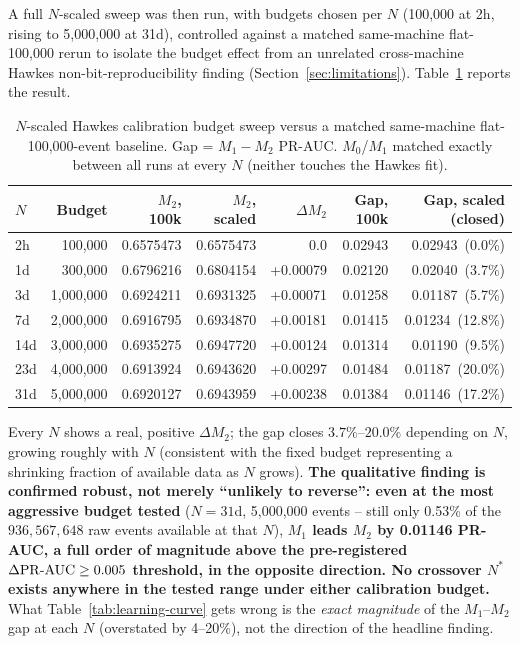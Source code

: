 A full $N$-scaled sweep was then run, with budgets chosen per $N$
(100{,}000 at 2h, rising to 5{,}000{,}000 at 31d), controlled against a
matched same-machine flat-100{,}000 rerun to isolate the budget effect
from an unrelated cross-machine Hawkes non-bit-reproducibility finding
(Section~\ref{sec:limitations}). Table~\ref{tab:calibration-sweep}
reports the result.

\begin{table}[htbp]
\centering
\caption{$N$-scaled Hawkes calibration budget sweep versus a matched
same-machine flat-100{,}000-event baseline. Gap = $M_1 - M_2$ PR-AUC.
$M_0$/$M_1$ matched exactly between all runs at every $N$ (neither
touches the Hawkes fit).}
\label{tab:calibration-sweep}
\begin{tabular}{@{}lrrrrrr@{}}
\toprule
$N$ & Budget & $M_2$, 100k & $M_2$, scaled & $\Delta M_2$ & Gap, 100k & Gap, scaled (closed) \\
\midrule
2h  & 100{,}000     & 0.6575473 & 0.6575473 & 0.0      & 0.02943 & 0.02943\ (0.0\%) \\
1d  & 300{,}000     & 0.6796216 & 0.6804154 & +0.00079 & 0.02120 & 0.02040\ (3.7\%) \\
3d  & 1{,}000{,}000 & 0.6924211 & 0.6931325 & +0.00071 & 0.01258 & 0.01187\ (5.7\%) \\
7d  & 2{,}000{,}000 & 0.6916795 & 0.6934870 & +0.00181 & 0.01415 & 0.01234\ (12.8\%) \\
14d & 3{,}000{,}000 & 0.6935275 & 0.6947720 & +0.00124 & 0.01314 & 0.01190\ (9.5\%) \\
23d & 4{,}000{,}000 & 0.6913924 & 0.6943620 & +0.00297 & 0.01484 & 0.01187\ (20.0\%) \\
31d & 5{,}000{,}000 & 0.6920127 & 0.6943959 & +0.00238 & 0.01384 & 0.01146\ (17.2\%) \\
\bottomrule
\end{tabular}
\end{table}

Every $N$ shows a real, positive $\Delta M_2$; the gap closes
$3.7\%$--$20.0\%$ depending on $N$, growing roughly with $N$ (consistent
with the fixed budget representing a shrinking fraction of available
data as $N$ grows). \textbf{The qualitative finding is confirmed robust,
not merely ``unlikely to reverse'': even at the most aggressive budget
tested} ($N=31$d, 5{,}000{,}000 events -- still only 0.53\% of the
$936{,}567{,}648$ raw events available at that $N$), \textbf{$M_1$ leads
$M_2$ by 0.01146 PR-AUC, a full order of magnitude above the
pre-registered $\Delta\mathrm{PR\text{-}AUC} \ge 0.005$ threshold, in the opposite
direction. No crossover $N^{*}$ exists anywhere in the tested range under
either calibration budget.} What Table~\ref{tab:learning-curve} gets
wrong is the \emph{exact magnitude} of the $M_1$--$M_2$ gap at each $N$
(overstated by 4--20\%), not the direction of the headline finding.

